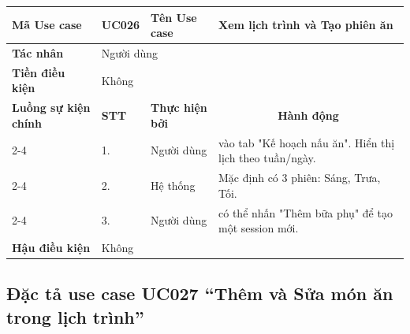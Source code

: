 \documentclass[../main.tex]{subfiles}
\begin{document}
\begin{longtable}{|p{2.7cm}|p{0.8cm}|p{2.6cm}|p{7.3cm}|}
\hline
\cellcolor[HTML]{D5F5E3}\textbf{Mã Use case} & \multicolumn{1}{l|}{UC026} & \cellcolor[HTML]{D5F5E3}\textbf{Tên Use case} & Xem lịch trình và Tạo phiên ăn \\ \hline
\cellcolor[HTML]{D5F5E3}\textbf{Tác nhân} & \multicolumn{3}{p{10.7cm}|}{Người dùng} \\ \hline
\cellcolor[HTML]{D5F5E3}\textbf{Tiền điều kiện} & \multicolumn{3}{p{10.7cm}|}{Không} \\ \hline

\cellcolor[HTML]{D5F5E3}\textbf{Luồng sự kiện chính} & \cellcolor[HTML]{FDEBD0}\textbf{STT} & \cellcolor[HTML]{FDEBD0}\textbf{Thực hiện bởi} & \multicolumn{1}{c|}{\cellcolor[HTML]{FDEBD0}\textbf{Hành động}} \\ \cline{2-4} 
\cellcolor[HTML]{D5F5E3} & 1. & Người dùng & vào tab "Kế hoạch nấu ăn". Hiển thị lịch theo tuần/ngày. \\ \cline{2-4} 
\cellcolor[HTML]{D5F5E3} & 2. & Hệ thống & Mặc định có 3 phiên: Sáng, Trưa, Tối. \\ \cline{2-4} 
\cellcolor[HTML]{D5F5E3} & 3. & Người dùng & có thể nhấn "Thêm bữa phụ" để tạo một session mới. \\ \hline

\cellcolor[HTML]{D5F5E3}\textbf{Hậu điều kiện} & \multicolumn{3}{p{10.7cm}|}{Không} \\ \hline
\end{longtable}
\endgroup

\subsection{Đặc tả use case UC027 ``Thêm và Sửa món ăn trong lịch trình''}
\vspace{0.5cm}

\begingroup
\renewcommand{\arraystretch}{1.5}
\end{document}
